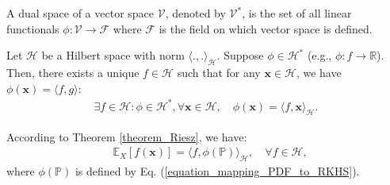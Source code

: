 \documentclass[lang=cn,10pt]{gorgeousnbook}
\numberwithin{equation}{section}%
\numberwithin{figure}{section}%
\begin{document}
\begin{definition}
A dual space of a vector space $\mathcal{V}$, denoted by $\mathcal{V}^*$, is the set of all linear functionals $\phi: \mathcal{V} \rightarrow \mathcal{F}$ where $\mathcal{F}$ is the field on which vector space is defined. 
\end{definition}

\begin{theorem}\label{theorem_Riesz}
Let $\mathcal{H}$ be a Hilbert space with norm $\langle.,.\rangle_\mathcal{H}$. Suppose $\phi \in \mathcal{H}^*$ (e.g., $\phi: f \rightarrow \mathbb{R}$). Then, there exists a unique $f \in \mathcal{H}$ such that for any $\boldsymbol{x} \in \mathcal{H}$, we have $\phi(\boldsymbol{x}) = \langle f,g \rangle$:
\begin{align}
\exists f \in \mathcal{H} : \phi \in \mathcal{H}^*, \forall \boldsymbol{x} \in \mathcal{H}, \quad  \phi(\boldsymbol{x}) = \langle f,\boldsymbol{x} \rangle_\mathcal{H}.
\end{align}
\end{theorem}


\begin{corollary}\label{corollary_Riesz_expectation}
According to Theorem \ref{theorem_Riesz}, we have:
\begin{align}
& \mathbb{E}_X[f(\boldsymbol{x})] = \langle f, \phi(\mathbb{P}) \rangle_{\mathcal{H}}, \quad \forall f \in \mathcal{H},
\end{align}
where $\phi(\mathbb{P})$ is defined by Eq. (\ref{equation_mapping_PDF_to_RKHS}).
\end{corollary}
\end{document}

